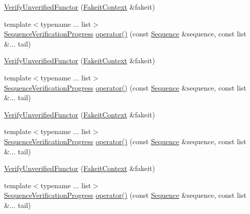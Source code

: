 \begin{DoxyCompactItemize}
\item 
\mbox{\hyperlink{classfakeit_1_1VerifyUnverifiedFunctor_adb55c8a4cdd929e88557f94d0b4fdf1e}{Verify\+Unverified\+Functor}} (\mbox{\hyperlink{structfakeit_1_1FakeitContext}{Fakeit\+Context}} \&fakeit)
\item 
{\footnotesize template$<$typename ... list$>$ }\\\mbox{\hyperlink{classfakeit_1_1SequenceVerificationProgress}{Sequence\+Verification\+Progress}} \mbox{\hyperlink{classfakeit_1_1VerifyUnverifiedFunctor_ac32fd9aaa7de99c3b6b89c39b642ecad}{operator()}} (const \mbox{\hyperlink{classfakeit_1_1Sequence}{Sequence}} \&sequence, const list \&... tail)
\item 
\mbox{\hyperlink{classfakeit_1_1VerifyUnverifiedFunctor_adb55c8a4cdd929e88557f94d0b4fdf1e}{Verify\+Unverified\+Functor}} (\mbox{\hyperlink{structfakeit_1_1FakeitContext}{Fakeit\+Context}} \&fakeit)
\item 
{\footnotesize template$<$typename ... list$>$ }\\\mbox{\hyperlink{classfakeit_1_1SequenceVerificationProgress}{Sequence\+Verification\+Progress}} \mbox{\hyperlink{classfakeit_1_1VerifyUnverifiedFunctor_ac32fd9aaa7de99c3b6b89c39b642ecad}{operator()}} (const \mbox{\hyperlink{classfakeit_1_1Sequence}{Sequence}} \&sequence, const list \&... tail)
\item 
\mbox{\hyperlink{classfakeit_1_1VerifyUnverifiedFunctor_adb55c8a4cdd929e88557f94d0b4fdf1e}{Verify\+Unverified\+Functor}} (\mbox{\hyperlink{structfakeit_1_1FakeitContext}{Fakeit\+Context}} \&fakeit)
\item 
{\footnotesize template$<$typename ... list$>$ }\\\mbox{\hyperlink{classfakeit_1_1SequenceVerificationProgress}{Sequence\+Verification\+Progress}} \mbox{\hyperlink{classfakeit_1_1VerifyUnverifiedFunctor_ac32fd9aaa7de99c3b6b89c39b642ecad}{operator()}} (const \mbox{\hyperlink{classfakeit_1_1Sequence}{Sequence}} \&sequence, const list \&... tail)
\item 
\mbox{\hyperlink{classfakeit_1_1VerifyUnverifiedFunctor_adb55c8a4cdd929e88557f94d0b4fdf1e}{Verify\+Unverified\+Functor}} (\mbox{\hyperlink{structfakeit_1_1FakeitContext}{Fakeit\+Context}} \&fakeit)
\item 
{\footnotesize template$<$typename ... list$>$ }\\\mbox{\hyperlink{classfakeit_1_1SequenceVerificationProgress}{Sequence\+Verification\+Progress}} \mbox{\hyperlink{classfakeit_1_1VerifyUnverifiedFunctor_ac32fd9aaa7de99c3b6b89c39b642ecad}{operator()}} (const \mbox{\hyperlink{classfakeit_1_1Sequence}{Sequence}} \&sequence, const list \&... tail)

\end{DoxyCompactItemize}
